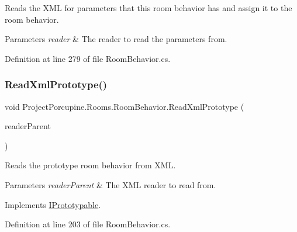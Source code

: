 Reads the X\+ML for parameters that this room behavior has and assign it to the room behavior. 


\begin{DoxyParams}{Parameters}
{\em reader} & The reader to read the parameters from.\\
\hline
\end{DoxyParams}


Definition at line 279 of file Room\+Behavior.\+cs.

\mbox{\label{class_project_porcupine_1_1_rooms_1_1_room_behavior_a7126ff361499e55f3a2badac20549766}} 
\subsubsection{\texorpdfstring{Read\+Xml\+Prototype()}{ReadXmlPrototype()}}
{\footnotesize\ttfamily void Project\+Porcupine.\+Rooms.\+Room\+Behavior.\+Read\+Xml\+Prototype (\begin{DoxyParamCaption}\item[{Xml\+Reader}]{reader\+Parent }\end{DoxyParamCaption})}



Reads the prototype room behavior from X\+ML. 


\begin{DoxyParams}{Parameters}
{\em reader\+Parent} & The X\+ML reader to read from.\\
\hline
\end{DoxyParams}


Implements \hyperlink{interface_i_prototypable_a024d752c4be655a7166db5718f1fad6a}{I\+Prototypable}.



Definition at line 203 of file Room\+Behavior.\+cs.

\mbox{\label{class_project_porcupine_1_1_rooms_1_1_room_behavior_a0f4f21306dc09b45b022e86d5879196f}} 
